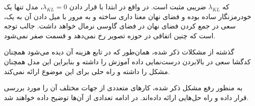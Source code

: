 که $\lambda_{KL}$ ضریبی مثبت است. در واقع در ابتدا با قرار دادن $\lambda_{KL}=0$، مدل تنها یک خودرمزنگار ساده بوده و فضای نهان معنا داری ساخته و به مرور با میل دادن آن به یک، سعی در جمع کردن فضای نهان در فضای گاوسی نرمال خواهد داشت. جالب توجه است که چنین اتفاقی در حوزه تصویر رخ نمی‌دهد و قسمت  صفر نمی‌شود.

گذشته از مشکلات ذکر شده، همان‌طور که در تابع هزینه آن دیده می‌شود همچنان کدگشا سعی در بالابردن درست‌نمایی داده آموزش را داشته و بنابراین این مدل همچنان مشکل \expbias{} را داشته و راه حلی برای این موضوع ارائه نمی‌کند.

به منظور رفع مشکل ذکر شده، کارهای متعددی از جهات مختلف آن را مورد بررسی قرار داده و راه حل‌هایی ارائه داده‌اند. در ادامه تعدادی از آن‌ها توضیح داده خواهند شد.
